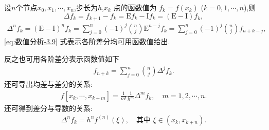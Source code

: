\documentclass[../../main.tex]{subfiles}%
\begin{document}
\begin{theorem}\label{theorem:差分的基本性质}
设$n$个节点$x_0,x_1,\cdots,x_n$,步长为$h$,$x_k$ 点的函数值为 $f_k = f(x_k)$ ($k = 0, 1, \cdots, n$),则
\[
\Delta f_k = f_{k+1} - f_k = \mathrm{E}f_k - \mathrm{I}f_k = (\mathrm{E} - \mathrm{I})f_k,
\]
\begin{align}
\Delta^n f_k = (\mathrm{E} - \mathrm{I})^n f_k = \sum_{j=0}^n (-1)^j \binom{n}{j} \mathrm{E}^{n-j} f_k = \sum_{j=0}^n (-1)^j \binom{n}{j} f_{n+k-j}, \label{eq:数值分析-3.9}
\end{align}
\eqref{eq:数值分析-3.9} 式表示各阶差分均可用函数值给出.

反之也可用各阶差分表示函数值如下
\begin{align}
f_{n+k} = \sum_{j=0}^n \binom{n}{j} \Delta^j f_k. \label{eq:数值分析-3.10}
\end{align}
还可导出均差与差分的关系:
\begin{align}
f[x_k, \cdots, x_{k+m}] = \frac{1}{m!} \frac{1}{h^m} \Delta^m f_k, \quad m = 1, 2, \cdots, n. \label{eq:数值分析-3.11}
\end{align}
还可得到差分与导数的关系:
\begin{align}
\Delta^n f_k = h^n f^{(n)}(\xi), \quad \text{其中 } \xi \in (x_k, x_{k+n}). \label{eq:数值分析-3.12}
\end{align}
\end{theorem}
\end{document}

